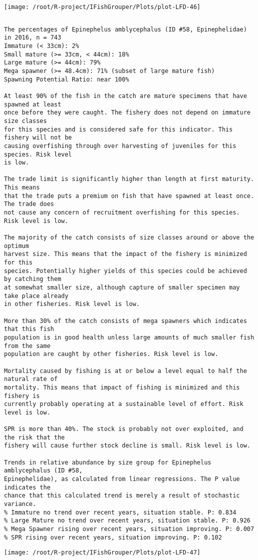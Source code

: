 \documentclass{report}\usepackage[]{graphicx}\usepackage[]{color}
\makeatletter
\def\maxwidth{ %
  \ifdim\Gin@nat@width>\linewidth
    \linewidth
  \else
    \Gin@nat@width
  \fi
}
\newenvironment{kframe}{%
 \def\at@end@of@kframe{}%
 \ifinner\ifhmode%
  \def\at@end@of@kframe{\end{minipage}}%
  \begin{minipage}{\columnwidth}%
 \fi\fi%
 \def\FrameCommand##1{\hskip\@totalleftmargin \hskip-\fboxsep
 \colorbox{shadecolor}{##1}\hskip-\fboxsep
     \hskip-\linewidth \hskip-\@totalleftmargin \hskip\columnwidth}%
 \MakeFramed {\advance\hsize-\width
   \@totalleftmargin\z@ \linewidth\hsize
   \@setminipage}}%
 {\par\unskip\endMakeFramed%
 \at@end@of@kframe}
\newenvironment{knitrout}{}{} %
\makeatother
\begin{document}
\begin{knitrout}
\texttt{[image: /root/R-project/IFishGrouper/Plots/plot-LFD-46]} 
\begin{kframe}\begin{verbatim}
\end{verbatim}
\end{kframe}
\clearpage
\newpage
\begin{kframe}\begin{verbatim}The percentages of Epinephelus amblycephalus (ID #58, Epinephelidae) in 2016, n = 743
Immature (< 33cm): 2%
Small mature (>= 33cm, < 44cm): 18%
Large mature (>= 44cm): 79%
Mega spawner (>= 48.4cm): 71% (subset of large mature fish)
Spawning Potential Ratio: near 100%
 
At least 90% of the fish in the catch are mature specimens that have spawned at least
once before they were caught. The fishery does not depend on immature size classes
for this species and is considered safe for this indicator. This fishery will not be
causing overfishing through over harvesting of juveniles for this species. Risk level
is low.

The trade limit is significantly higher than length at first maturity.  This means
that the trade puts a premium on fish that have spawned at least once. The trade does
not cause any concern of recruitment overfishing for this species. Risk level is low.

The majority of the catch consists of size classes around or above the optimum
harvest size. This means that the impact of the fishery is minimized for this
species. Potentially higher yields of this species could be achieved by catching them
at somewhat smaller size, although capture of smaller specimen may take place already
in other fisheries. Risk level is low.

More than 30% of the catch consists of mega spawners which indicates that this fish
population is in good health unless large amounts of much smaller fish from the same
population are caught by other fisheries. Risk level is low.
 
Mortality caused by fishing is at or below a level equal to half the natural rate of
mortality. This means that impact of fishing is minimized and this fishery is
currently probably operating at a sustainable level of effort. Risk level is low.
 
SPR is more than 40%. The stock is probably not over exploited, and the risk that the
fishery will cause further stock decline is small. Risk level is low.
 
Trends in relative abundance by size group for Epinephelus amblycephalus (ID #58,
Epinephelidae), as calculated from linear regressions. The P value indicates the
chance that this calculated trend is merely a result of stochastic variance.
% Immature no trend over recent years, situation stable. P: 0.834
% Large Mature no trend over recent years, situation stable. P: 0.926
% Mega Spawner rising over recent years, situation improving. P: 0.007
% SPR rising over recent years, situation improving. P: 0.102
\end{verbatim}
\end{kframe}
\texttt{[image: /root/R-project/IFishGrouper/Plots/plot-LFD-47]} 


\end{knitrout}
\end{document}

